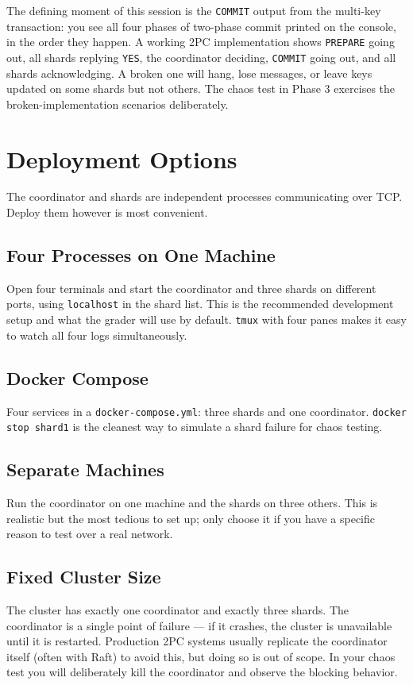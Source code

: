 \documentclass[11pt,a4paper]{article}
\begin{document}
The defining moment of this session is the \texttt{COMMIT} output from the multi-key transaction: you see all four phases of two-phase commit printed on the console, in the order they happen. A working 2PC implementation shows \texttt{PREPARE} going out, all shards replying \texttt{YES}, the coordinator deciding, \texttt{COMMIT} going out, and all shards acknowledging. A broken one will hang, lose messages, or leave keys updated on some shards but not others. The chaos test in Phase 3 exercises the broken-implementation scenarios deliberately.

\section{Deployment Options}

The coordinator and shards are independent processes communicating over TCP. Deploy them however is most convenient.

\subsection{Four Processes on One Machine}
Open four terminals and start the coordinator and three shards on different ports, using \texttt{localhost} in the shard list. This is the recommended development setup and what the grader will use by default. \texttt{tmux} with four panes makes it easy to watch all four logs simultaneously.

\subsection{Docker Compose}
Four services in a \texttt{docker-compose.yml}: three shards and one coordinator. \texttt{docker stop shard1} is the cleanest way to simulate a shard failure for chaos testing.

\subsection{Separate Machines}
Run the coordinator on one machine and the shards on three others. This is realistic but the most tedious to set up; only choose it if you have a specific reason to test over a real network.

\subsection{Fixed Cluster Size}
The cluster has exactly one coordinator and exactly three shards. The coordinator is a single point of failure --- if it crashes, the cluster is unavailable until it is restarted. Production 2PC systems usually replicate the coordinator itself (often with Raft) to avoid this, but doing so is out of scope. In your chaos test you will deliberately kill the coordinator and observe the blocking behavior.
\end{document}
